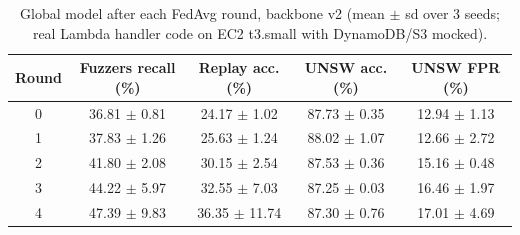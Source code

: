 \begin{table}[t]\centering
\caption{Global model after each FedAvg round, backbone v2 (mean $\pm$ sd over 3 seeds; real Lambda handler code on EC2 t3.small with DynamoDB/S3 mocked).}
\label{tab:fed_rounds_v2}
\begin{tabular}{ccccc}\toprule
Round & Fuzzers recall (\%) & Replay acc. (\%) & UNSW acc. (\%) & UNSW FPR (\%) \\ \midrule
0 & 36.81 $\pm$ 0.81 & 24.17 $\pm$ 1.02 & 87.73 $\pm$ 0.35 & 12.94 $\pm$ 1.13 \\
1 & 37.83 $\pm$ 1.26 & 25.63 $\pm$ 1.24 & 88.02 $\pm$ 1.07 & 12.66 $\pm$ 2.72 \\
2 & 41.80 $\pm$ 2.08 & 30.15 $\pm$ 2.54 & 87.53 $\pm$ 0.36 & 15.16 $\pm$ 0.48 \\
3 & 44.22 $\pm$ 5.97 & 32.55 $\pm$ 7.03 & 87.25 $\pm$ 0.03 & 16.46 $\pm$ 1.97 \\
4 & 47.39 $\pm$ 9.83 & 36.35 $\pm$ 11.74 & 87.30 $\pm$ 0.76 & 17.01 $\pm$ 4.69 \\
\bottomrule\end{tabular}\end{table}

